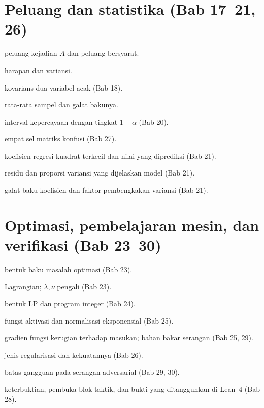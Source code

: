 \section*{Peluang dan statistika (Bab 17--21, 26)}
\begin{description}[style=nextline,itemsep=0.25em]
  \item[$P(A)$, $P(A\mid B)$] peluang kejadian $A$ dan peluang bersyarat.
  \item[{$\mathbb{E}[X]$, $\operatorname{Var}X$}] harapan dan variansi.
  \item[$\operatorname{Cov}(X,Y)$] kovarians dua variabel acak (Bab 18).
  \item[$\bar{X}_n$, $\mathrm{se}$] rata-rata sampel dan galat bakunya.
  \item[$\mathrm{CI}_{1-\alpha}$] interval kepercayaan dengan tingkat
        $1-\alpha$ (Bab 20).
  \item[$\mathrm{TP}$, $\mathrm{FP}$, $\mathrm{FN}$, $\mathrm{TN}$] empat sel
        matriks konfusi (Bab 27).
  \item[$\hat{\beta}$, $\hat{y}=X\hat{\beta}$] koefisien regresi kuadrat
        terkecil dan nilai yang diprediksi (Bab 21).
  \item[$e_i=y_i-\hat{y}_i$, $R^2$] residu dan proporsi variansi yang dijelaskan
        model (Bab 21).
  \item[$\mathrm{se}(\hat{\beta}_j)$, $\mathrm{VIF}_j$] galat baku koefisien dan
        faktor pembengkakan variansi (Bab 21).
\end{description}

\section*{Optimasi, pembelajaran mesin, dan verifikasi (Bab 23--30)}
\begin{description}[style=nextline,itemsep=0.25em]
  \item[$\min f_0(x)$ dengan $f_i(x)\le 0$] bentuk baku masalah optimasi (Bab 23).
  \item[$L(x,\lambda,\nu)$] Lagrangian; $\lambda,\nu$ pengali (Bab 23).
  \item[$c^{\top}x$, $Ax\le b$, $x\in\mathbb{Z}^n$] bentuk LP dan program integer
        (Bab 24).
  \item[$\sigma(\cdot)$, $\mathrm{softmax}$] fungsi aktivasi dan normalisasi
        eksponensial (Bab 25).
  \item[$\nabla_{\mathbf{x}}\ell$] gradien fungsi kerugian terhadap masukan;
        bahan bakar serangan (Bab 25, 29).
  \item[$L_2$, $L_1$, $\lambda_{\text{reg}}$] jenis regularisasi dan kekuatannya
        (Bab 26).
  \item[$\|\delta\|_{\infty}\le\varepsilon$] batas gangguan pada serangan
        adversarial (Bab 29, 30).
  \item[$\vdash$, \texttt{by}, \texttt{sorry}] keterbuktian, pembuka blok taktik,
        dan bukti yang ditangguhkan di Lean~4 (Bab 28).
\end{description}
